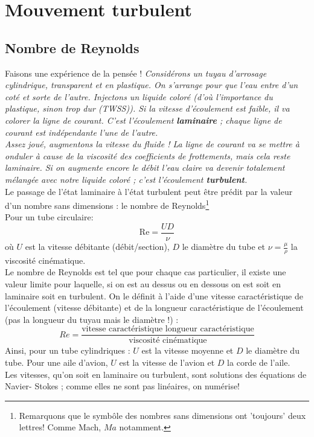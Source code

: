 \section{Mouvement turbulent}
	\subsection{Nombre de Reynolds}
	Faisons une expérience de la pensée ! \textit{Considérons un tuyau d'arrosage cylindrique,
	transparent et en plastique. On s'arrange pour que l'eau entre d'un coté et sorte de l'autre.
	Injectons un liquide coloré (d'où l'importance du plastique, sinon trop dur (TWSS)). Si la
	vitesse d'écoulement est faible, il va colorer la ligne de courant. C'est l'écoulement 
	\textbf{laminaire} ; chaque ligne de courant est indépendante l'une de l'autre.}\\
	
	\textit{Assez joué, augmentons la vitesse du fluide ! La ligne de courant va se mettre à onduler à
	cause de la viscosité des coefficients de frottements, mais cela reste laminaire. Si on augmente
	encore le débit l'eau claire va devenir totalement mélangée avec notre liquide coloré ; c'est 
	l'écoulement \textbf{turbulent}.}\ \\
	
	Le passage de l'état laminaire à l'état turbulent peut être prédit par la valeur d'un
	nombre sans dimensions : le nombre de Reynolds\footnote{Remarquons que le symbôle des
	nombres sans dimensions ont 'toujours' deux lettres! Comme Mach, $Ma$ notamment.}\\
	Pour un tube circulaire:
	\begin{equation}
	\text{Re} = \frac{UD}{\nu}
	\end{equation}
	où $U$ est la vitesse débitante (débit/section), $D$ le diamètre du tube et $\nu = \frac{
	\mu}{\rho}$ la 	viscosité cinématique.\\
		
	
	Le nombre de Reynolds est tel que pour chaque cas particulier, il existe une valeur limite pour 
	laquelle, si on est au dessus ou en dessous on est soit en laminaire soit en turbulent. On le 
	définit à l'aide d'une vitesse caractéristique de l’écoulement (vitesse débitante) et de la longueur
	caractéristique de l’écoulement (pas la longueur du tuyau mais le diamètre !)	:
	\begin{equation}
	Re = \frac{\text{vitesse caractéristique\ \ \ \ \ longueur caractéristique}}{\text{viscosité 
	cinématique}}
	\end{equation}
	Ainsi, pour un tube cylindriques : $U$ est la vitesse moyenne et $D$ le diamètre du tube. Pour
	une aile d'avion, $U$ est la vitesse de l'avion et $D$ la corde de l'aile.\\
	Les vitesses, qu'on soit en laminaire ou turbulent, sont solutions des équations de Navier-
	Stokes ; comme elles ne sont pas linéaires, on numérise!
	
